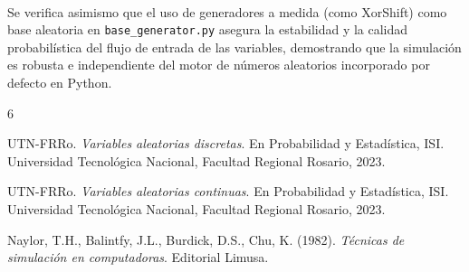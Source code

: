\documentclass{article}
\begin{document}
\paragraph{}
Se verifica asimismo que el uso de generadores a medida (como XorShift) como base aleatoria en \texttt{base\_generator.py} asegura la estabilidad y la calidad probabilística del flujo de entrada de las variables, demostrando que la simulación es robusta e independiente del motor de números aleatorios incorporado por defecto en Python.

\begin{thebibliography}{6}

UTN-FRRo. \textit{Variables aleatorias discretas}. En Probabilidad y Estadística, ISI. Universidad Tecnológica Nacional, Facultad Regional Rosario, 2023.

UTN-FRRo. \textit{Variables aleatorias continuas}. En Probabilidad y Estadística, ISI. Universidad Tecnológica Nacional, Facultad Regional Rosario, 2023.

Naylor, T.H., Balintfy, J.L., Burdick, D.S., Chu, K. (1982). \textit{Técnicas de simulación en computadoras}. Editorial Limusa.

\end{thebibliography}
\end{document}
